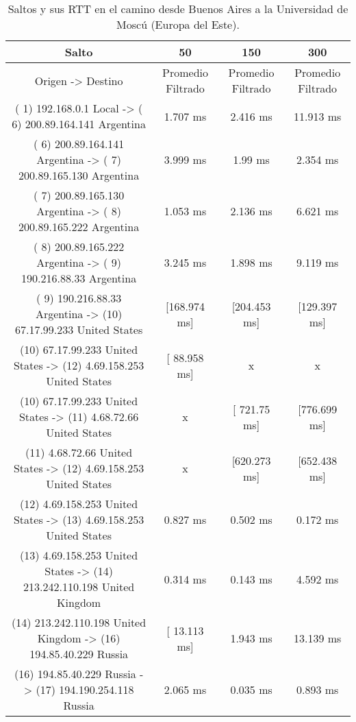 \begin{table}[]
\centering
\caption{Saltos y sus RTT en el camino desde Buenos Aires a la Universidad de Moscú (Europa del Este).}
\begin{tabular}{ | c | c | c | c | }
	\hline 
Salto	& 50	& 150	& 300 \\ \hline
Origen                ->               Destino               	                 & Promedio Filtrado	 & Promedio Filtrado&	Promedio Filtrado\\ \hline
( 1) 192.168.0.1     Local           -> ( 6) 200.89.164.141  Argentina     & 	     1.707 ms   	 &    2.416 ms   	  &  11.913 ms   \\ \hline
( 6) 200.89.164.141  Argentina       -> ( 7) 200.89.165.130  Argentina     & 	     3.999 ms   	 &     1.99 ms   	  &   2.354 ms   \\ \hline
( 7) 200.89.165.130  Argentina       -> ( 8) 200.89.165.222  Argentina     & 	     1.053 ms   	 &    2.136 ms   	  &   6.621 ms   \\ \hline
( 8) 200.89.165.222  Argentina       -> ( 9) 190.216.88.33   Argentina     & 	     3.245 ms   	 &    1.898 ms   	  &   9.119 ms   \\ \hline
( 9) 190.216.88.33   Argentina       -> (10) 67.17.99.233    United States & 	  [168.974 ms]  	 & [204.453 ms]  	  &[129.397 ms]  \\ \hline
(10) 67.17.99.233    United States   -> (12) 4.69.158.253    United States  	  & [ 88.958 ms]       &      	x	         &    x\\ \hline
(10) 67.17.99.233    United States   -> (11) 4.68.72.66      United States & 	     x                 &  [ 721.75 ms]  &	  [776.699 ms]  \\ \hline
(11) 4.68.72.66      United States   -> (12) 4.69.158.253    United States & 	       x               &  [620.273 ms]  &	  [652.438 ms]  \\ \hline
(12) 4.69.158.253    United States   -> (13) 4.69.158.253    United States & 	     0.827 ms   	 &    0.502 ms   	  &   0.172 ms   \\ \hline
(13) 4.69.158.253    United States   -> (14) 213.242.110.198 United Kingdom& 	     0.314 ms   	 &    0.143 ms   	  &   4.592 ms   \\ \hline
(14) 213.242.110.198 United Kingdom  -> (16) 194.85.40.229   Russia        & 	  [ 13.113 ms]  	 &    1.943 ms   	  &  13.139 ms   \\ \hline
(16) 194.85.40.229   Russia          -> (17) 194.190.254.118 Russia        & 	     2.065 ms   	 &    0.035 ms   	  &   0.893 ms   \\ \hline

\end{tabular}
\end{table}
